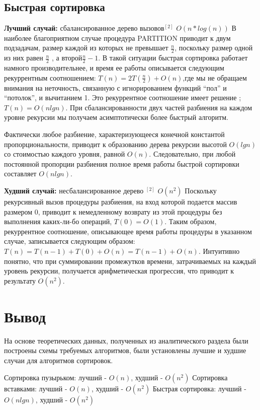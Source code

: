 \subsection{Быстрая сортировка}
\hspace*{5mm}
\textbf{Лучший случай:} сбалансированное дерево вызовов$^{[2]}$ \(O(n*log(n))\)  
В наиболее благоприятном случае процедура PARTITION приводит к двум подзадачам, размер каждой из которых не превышает $\frac{n}{2}$, поскольку размер одной из них равен $\frac{n}{2}$ , а второй$\frac{n}{2} - 1$. В такой ситуации быстрая сортировка работает намного производительнее, и время ее работы описывается следующим рекуррентным соотношением: $T(n) = 2T(\frac{n}{2}) + O(n)$,где мы не обращаем внимания на неточность, связанную с игнорированием функций “пол” и “потолок”, и вычитанием 1. Это рекуррентное соотношение имеет решение ; $T(n) =O(nlgn)$. При сбалансированности двух частей разбиения на каждом уровне рекурсии мы получаем асимптотически более быстрый алгоритм.

Фактически любое разбиение, характеризующееся конечной константой пропорциональности, приводит к образованию дерева рекурсии высотой $O(lgn)$ со стоимостью каждого уровня, равной $O(n)$. Следовательно, при любой постоянной пропорции разбиения полное время работы быстрой сортировки составляет $O(nlgn)$.

\textbf{Худший случай:} несбалансированное дерево $^{[2]}$ $O(n^2)$
Поскольку рекурсивный вызов процедуры разбиения, на вход которой подается массив размером 0, приводит к немедленному возврату из этой процедуры без выполнения каких-ли-бо операций, $T(0) = O(1)$. Таким образом, рекуррентное соотношение, описывающее время работы процедуры в указанном случае, записывается следующим образом: 
$T(n) =T(n-1) +T(0) + O(n) =T(n-1) + O(n)$. Интуитивно понятно, что при суммировании промежутков времени, затрачиваемых на каждый уровень рекурсии, получается арифметическая прогрессия, что приводит к результату $O(n^2)$.



\section*{Вывод}

На основе теоретических данных, полученных из аналитического раздела были построены схемы требуемых алгоритмов, были установлены лучшие и худшие случаи для алгоритмов сортировок.\newline

\noindent Сортировка пузырьком: лучший - $O(n)$, худший - $O(n^2)$ \newline
Сортировка вставками: лучший - $O(n)$, худший - $O(n^2)$ \newline
Быстрая сортировка: лучший - $O(nlgn)$, худший - $O(n^2)$ \newline



